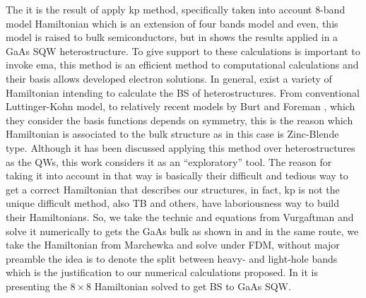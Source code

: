 The  it is the result of apply \gls{kp} method, specifically taken into account 8-band model Hamiltonian\cite{kane1957bandstructure,galeriu2005k,vurgaftman2020bands} which is an extension of four bands model\cite{galeriu2005k} and even, this model is raised to bulk semiconductors, but in  shows the results applied in a GaAs SQW heterostructure. To give support to these calculations is important to invoke \gls{ema}, this method is an efficient method to computational calculations\cite{yeo2020first,harrison2016quantum} and their basis allows developed electron solutions. In general,  exist a variety of Hamiltonian intending to calculate the \gls{BS} of heterostructures. From conventional Luttinger-Kohn model, \cite{Luttinger1955motion} to relatively recent models by Burt and Foreman \cite{burt1988aneweffective,foreman1993effective,burt1992justification}, which they consider the basis functions depends on symmetry, this is the reason which  Hamiltonian is associated to the bulk structure as in this case is Zinc-Blende type. 
Although it has been discussed applying this method over heterostructures as the QWs, this work considers it as an ``exploratory'' tool. The reason for taking it into account in that way is basically their difficult and tedious way to get a correct Hamiltonian that describes our structures, in fact, \gls{kp} is not the unique difficult method, also \gls{TB} and others, have laboriousness way to build their Hamiltonians. So, we take the technic and equations from Vurgaftman \cite{vurgaftman2020bands} and solve it numerically to gets the GaAs bulk as shown in  and in the same route, we take the Hamiltonian from Marchewka\cite{marchewka2017finite,novik2005bandstructure} and solve under \gls{FDM}, without major preamble the idea is to denote the split between heavy- and light-hole bands which is the justification to our numerical calculations proposed. In  it is presenting the $8\times 8$ Hamiltonian solved to get \gls{BS} to GaAs SQW.
